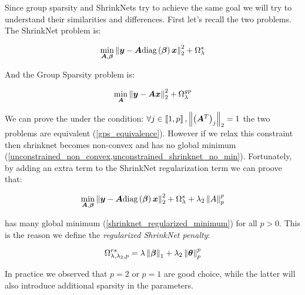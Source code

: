 Since group sparsity and ShrinkNets try to achieve the same goal we will try to understand their similarities and differences. First let's recall the two problems. The ShrinkNet problem is:

\begin{equation}
  \min_{\bm{A}, \bm{\beta}} \left\lVert\bm{y} - \bm{A}\text{diag}\left(\bm{\beta}\right)\bm{x}\right\rVert_2^2 + \Omega_\lambda^s
\end{equation}

And the Group Sparsity problem is:

\begin{equation}
  \min_{\bm{A}} \left\lVert\bm{y} - \bm{A}\bm{x}\right\rVert_2^2 + \Omega_\lambda^{gp}
\end{equation}

We can prove the under the condition: $\forall j\in \left\llbracket1, p\right\rrbracket, \left\lVert\left(\bm{A}^T\right)_j\right\rVert_2 = 1$ the two problems are equivalent (\cref{gps_equivalence}). However if we relax this constraint then shrinknet becomes non-convex and has no global minimum (\cref{unconstrained_non_convex,unconstrained_shrinknet_no_min}). Fortunately, by adding an extra term to the ShrinkNet regularization term we can proove that:

\begin{equation}
  \min_{\bm{A}, \bm{\beta}} \left\lVert\bm{y} - \bm{A}\text{diag}\left(\bm{\beta}\right)\bm{x}\right\rVert_2^2 + \Omega_\lambda^s + \lambda_2\left\lVert A\right\rVert_p^p
\end{equation}

has many global minimum (\cref{shrinknet_regularized_minimum}) for all $p>0$. This is the reason we define the \textit{regularized ShrinkNet penalty}:

\begin{equation}
  \Omega_{\lambda, \lambda_2, p}^{rs} = \lambda\left\lVert\bm{\beta}\right\rVert_1 + \lambda_2\left\lVert\bm\theta\right\rVert_p^p
\end{equation}

In practice we observed that $p=2$ or $p=1$ are good choice, while the latter will also introduce additional sparsity in the parameters.